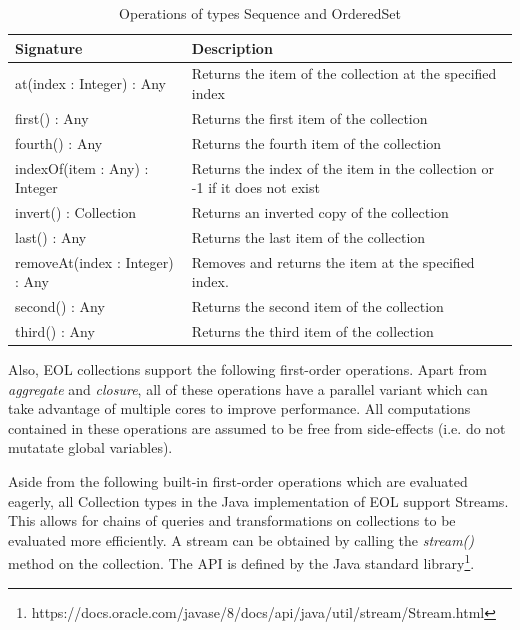 \begin{longtabu} {|p{6.5cm}|X|}
\caption{Operations of types Sequence and OrderedSet}
\label{tab:SortedOperations}\\
\hline
    \textbf{Signature} & \textbf{Description} \\\hline

    at(index : Integer) : Any & Returns the item of the collection at the specified index \\\hline
    
    first() : Any & Returns the first item of the collection  \\\hline
    
    fourth() : Any & Returns the fourth item of the collection  \\\hline
    
    indexOf(item : Any) : Integer & Returns the index of the item in the collection or -1 if it does not exist \\\hline
    
    invert() : Collection & Returns an inverted copy of the collection\\\hline
    
    last() : Any & Returns the last item of the collection  \\\hline
    
    removeAt(index : Integer) : Any & Removes and returns the item at the specified index. \\\hline
    
    second() : Any & Returns the second item of the collection  \\\hline
    
    third() : Any & Returns the third item of the collection  \\\hline
\end{longtabu}

Also, EOL collections support the following first-order operations. Apart from \emph{aggregate} and \emph{closure}, all of these operations have a parallel variant which can take advantage of multiple cores to improve performance. All computations contained in these operations are assumed to be free from side-effects (i.e. do not mutatate global variables).

Aside from the following built-in first-order operations which are evaluated eagerly, all Collection types in the Java implementation of EOL support Streams. This allows for chains of queries and transformations on collections to be evaluated more efficiently. A stream can be obtained by calling the \emph{stream()} method on the collection. The API is defined by the Java standard library\footnote{https://docs.oracle.com/javase/8/docs/api/java/util/stream/Stream.html}.

